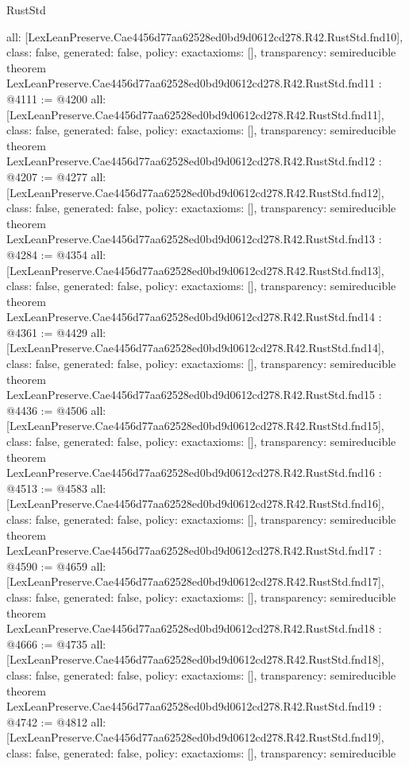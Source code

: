 \begin{lexlean}{RustStd}
\begin{coremodule}
{  all: [LexLeanPreserve.Cae4456d77aa62528ed0bd9d0612cd278.R42.RustStd.fnd10],
  class: false,
  generated: false,
  policy: exact{axioms: []},
  transparency: semireducible
}
theorem LexLeanPreserve.Cae4456d77aa62528ed0bd9d0612cd278.R42.RustStd.fnd11 : @4111 := @4200 {
  all: [LexLeanPreserve.Cae4456d77aa62528ed0bd9d0612cd278.R42.RustStd.fnd11],
  class: false,
  generated: false,
  policy: exact{axioms: []},
  transparency: semireducible
}
theorem LexLeanPreserve.Cae4456d77aa62528ed0bd9d0612cd278.R42.RustStd.fnd12 : @4207 := @4277 {
  all: [LexLeanPreserve.Cae4456d77aa62528ed0bd9d0612cd278.R42.RustStd.fnd12],
  class: false,
  generated: false,
  policy: exact{axioms: []},
  transparency: semireducible
}
theorem LexLeanPreserve.Cae4456d77aa62528ed0bd9d0612cd278.R42.RustStd.fnd13 : @4284 := @4354 {
  all: [LexLeanPreserve.Cae4456d77aa62528ed0bd9d0612cd278.R42.RustStd.fnd13],
  class: false,
  generated: false,
  policy: exact{axioms: []},
  transparency: semireducible
}
theorem LexLeanPreserve.Cae4456d77aa62528ed0bd9d0612cd278.R42.RustStd.fnd14 : @4361 := @4429 {
  all: [LexLeanPreserve.Cae4456d77aa62528ed0bd9d0612cd278.R42.RustStd.fnd14],
  class: false,
  generated: false,
  policy: exact{axioms: []},
  transparency: semireducible
}
theorem LexLeanPreserve.Cae4456d77aa62528ed0bd9d0612cd278.R42.RustStd.fnd15 : @4436 := @4506 {
  all: [LexLeanPreserve.Cae4456d77aa62528ed0bd9d0612cd278.R42.RustStd.fnd15],
  class: false,
  generated: false,
  policy: exact{axioms: []},
  transparency: semireducible
}
theorem LexLeanPreserve.Cae4456d77aa62528ed0bd9d0612cd278.R42.RustStd.fnd16 : @4513 := @4583 {
  all: [LexLeanPreserve.Cae4456d77aa62528ed0bd9d0612cd278.R42.RustStd.fnd16],
  class: false,
  generated: false,
  policy: exact{axioms: []},
  transparency: semireducible
}
theorem LexLeanPreserve.Cae4456d77aa62528ed0bd9d0612cd278.R42.RustStd.fnd17 : @4590 := @4659 {
  all: [LexLeanPreserve.Cae4456d77aa62528ed0bd9d0612cd278.R42.RustStd.fnd17],
  class: false,
  generated: false,
  policy: exact{axioms: []},
  transparency: semireducible
}
theorem LexLeanPreserve.Cae4456d77aa62528ed0bd9d0612cd278.R42.RustStd.fnd18 : @4666 := @4735 {
  all: [LexLeanPreserve.Cae4456d77aa62528ed0bd9d0612cd278.R42.RustStd.fnd18],
  class: false,
  generated: false,
  policy: exact{axioms: []},
  transparency: semireducible
}
theorem LexLeanPreserve.Cae4456d77aa62528ed0bd9d0612cd278.R42.RustStd.fnd19 : @4742 := @4812 {
  all: [LexLeanPreserve.Cae4456d77aa62528ed0bd9d0612cd278.R42.RustStd.fnd19],
  class: false,
  generated: false,
  policy: exact{axioms: []},
  transparency: semireducible
}
\end{coremodule}
\end{lexlean}
